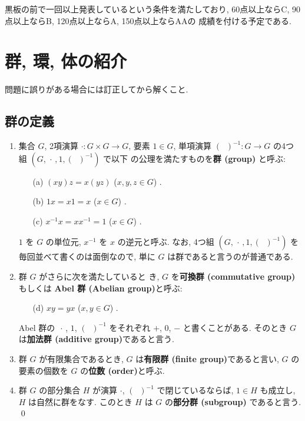 \documentclass[12pt,twoside]{jarticle}
\begin{document}
黒板の前で一回以上発表しているという条件を満たしており, 
60点以上ならC, 90点以上ならB, 120点以上ならA, 150点以上ならAAの
成績を付ける予定である.


\section{群, 環, 体の紹介}

問題に誤りがある場合には訂正してから解くこと.


\subsection{群の定義}
\label{ss:group-def}

\begin{definition}[群]
\quad
\begin{enumerate}
\item 
  集合 $G$, 2項演算 $\cdot:G\times G\to G$, 要素 $1\in G$, 
  単項演算 $(\;\;)^{-1}:G\to G$ の4つ組 $(G,\,\cdot\,,1,(\;\;)^{-1})$ で以下
  の公理を満たすものを{\bf 群 (group)} と呼ぶ:
  \begin{enumerate}
  \item[(a)] $(xy)z = x(yz)$ \quad ($x,y,z\in G$)     .
  \item[(b)] $1x = x1 = x$ \quad ($x\in G$)           .
  \item[(c)] $x^{-1}x = xx^{-1} = 1$ \quad ($x\in G$) .
  \end{enumerate}
  $1$ を $G$ の単位元, $x^{-1}$ を $x$ の逆元と呼ぶ. 
  なお, 4つ組 $(G,\,\cdot\,,1,(\;\;)^{-1})$ を毎回並べて書くのは面倒なので, %
  単に $G$ は群であると言うのが普通である. 
\item
  群 $G$ がさらに次を満たしていると
  き, $G$ を{\bf 可換群 (commutative group)}
  もしくは {\bf Abel 群 (Abelian group)}と呼ぶ:
  \begin{enumerate}
  \item[(d)] $xy = yx$ \quad ($x,y\in G$) .
  \end{enumerate}
  Abel 群の $\,\cdot\,$, $1$, $(\;\;)^{-1}$ をそれぞれ %
  $+$, $0$, $-$ と書くことがある. 
  そのとき $G$ は{\bf 加法群 (additive group)}であると言う.
\item
  群 $G$ が有限集合であるとき, $G$ は{\bf 有限群 (finite group)}であると言い, 
  $G$ の要素の個数を $G$ の{\bf 位数 (order)}と呼ぶ.
\item
  群 $G$ の部分集合 $H$ が演算 $\cdot$, $(\;\;)^{-1}$ で閉じているならば, 
  $1\in H$ も成立し, $H$ は自然に群をなす.
  このとき $H$ は $G$ の{\bf 部分群 (subgroup)} であると言う.
  \qed
\end{enumerate}
\end{definition}
\end{document}
